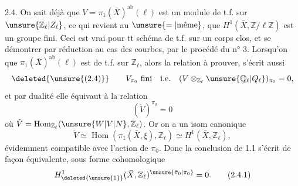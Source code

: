 2.4. 
On sait déjà que $V=\pi_1(\bar X)^{\mathrm{ab}}(\ell)$ est un module de t.f. sur $\unsure{\mathbb Z_\ell|Z_\ell}$,  ce qui revient au $\unsure{=|\text{même}}$, que $H^1(\bar X,\mathbb Z/\ell\mathbb Z)$ est un groupe fini. \deleted{\unsure{(}} Ceci est vrai pour tt schéma de t.f. sur un corps   clos, et se  démontrer par réduction au cas des courbes, par le procédé du n° 3.
Lorsqu'on   que $\pi_1(\bar X)^{\mathrm{ab}}(\ell)$ est de t.f. sur $\mathbb Z_\ell$, alors la relation à prouver,  s'écrit aussi 
\[
\deleted{\unsure{(2.4)}}\qquad V_{\pi_0}\ \text{fini}\quad\text{i.e.}\quad (V\otimes_{\mathbb Z_\ell}\unsure{\mathbb Q_\ell|Q_\ell})_{\pi_0}=0,
\]
et par dualité elle équivaut à la relation
\[
(\check V)^{\pi_0}=0
\]
où $\check V=\operatorname{Hom}_{\mathbb Z_\ell}(\unsure{W|V|N},\mathbb Z_\ell)$. Or on a un isom canonique
\[
\check V\simeq\operatorname{Hom}(\pi_1(\bar X,\xi),\mathbb Z_\ell)\simeq H^1(\bar X,\mathbb Z_\ell),
\]
évidemment compatible avec l'action de $\pi_0$. Donc la conclusion de 1.1 s'écrit de façon équivalente, sous forme cohomologique
\[
H_{\deleted{\unsure{1}}}^1(\bar X,\mathbb Z_\ell)^{\unsure{\bar\pi_0|\pi_0}}=0.\tag*{(2.4.1)}
\]
